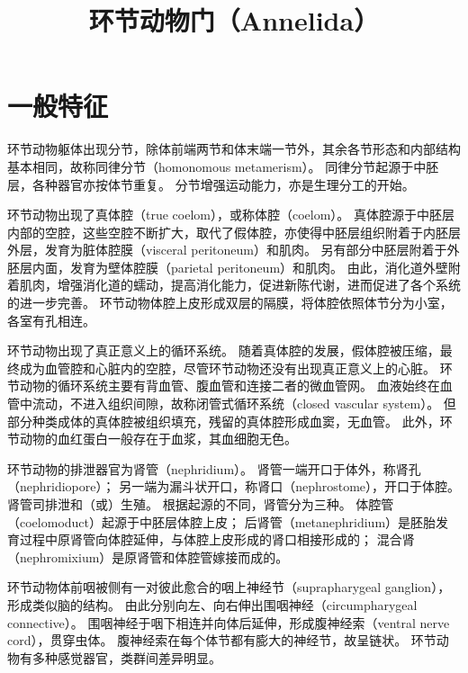 \documentclass[11pt]{article}
\title{环节动物门（Annelida）}
\date{}
\begin{document}
  \maketitle

  \linenumbers
  
\section{一般特征}
环节动物躯体出现分节，除体前端两节和体末端一节外，其余各节形态和内部结构基本相同，故称同律分节（homonomous metamerism）。
同律分节起源于中胚层，各种器官亦按体节重复。
分节增强运动能力，亦是生理分工的开始。

\newline

环节动物出现了真体腔（true coelom），或称体腔（coelom）。
真体腔源于中胚层内部的空腔，这些空腔不断扩大，取代了假体腔，亦使得中胚层组织附着于内胚层外层，发育为脏体腔膜（visceral peritoneum）和肌肉。
另有部分中胚层附着于外胚层内面，发育为壁体腔膜（parietal peritoneum）和肌肉。
由此，消化道外壁附着肌肉，增强消化道的蠕动，提高消化能力，促进新陈代谢，进而促进了各个系统的进一步完善。
环节动物体腔上皮形成双层的隔膜，将体腔依照体节分为小室，各室有孔相连。

\newline

环节动物出现了真正意义上的循环系统。
随着真体腔的发展，假体腔被压缩，最终成为血管腔和心脏内的空腔，尽管环节动物还没有出现真正意义上的心脏。
环节动物的循环系统主要有背血管、腹血管和连接二者的微血管网。
血液始终在血管中流动，不进入组织间隙，故称闭管式循环系统（closed vascular system）。
但部分种类成体的真体腔被组织填充，残留的真体腔形成血窦，无血管。
此外，环节动物的血红蛋白一般存在于血浆，其血细胞无色。

\newline

环节动物的排泄器官为肾管（nephridium）。
肾管一端开口于体外，称肾孔（nephridiopore）；
另一端为漏斗状开口，称肾口（nephrostome），开口于体腔。
肾管司排泄和（或）生殖。
根据起源的不同，肾管分为三种。
体腔管（coelomoduct）起源于中胚层体腔上皮；
后肾管（metanephridium）是胚胎发育过程中原肾管向体腔延伸，与体腔上皮形成的肾口相接形成的；
混合肾（nephromixium）是原肾管和体腔管嫁接而成的。

\newline

环节动物体前咽被侧有一对彼此愈合的咽上神经节（suprapharygeal ganglion），形成类似脑的结构。
由此分别向左、向右伸出围咽神经（circumpharygeal connective）。
围咽神经于咽下相连并向体后延伸，形成腹神经索（ventral nerve cord），贯穿虫体。
腹神经索在每个体节都有膨大的神经节，故呈链状。
环节动物有多种感觉器官，类群间差异明显。
\end{document}
